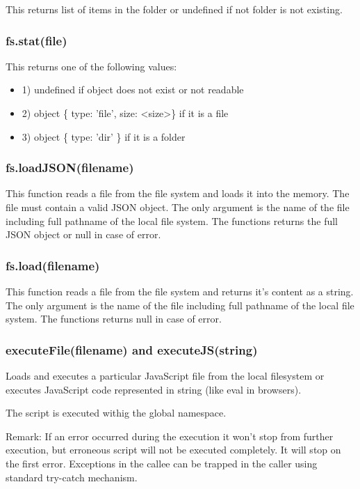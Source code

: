 This returns list of items in the folder or undefined if not folder is not existing.


\subsubsection{fs.stat(file)}

This returns one of the following values:

\begin{itemize}
\item 1) undefined if object does not exist or not readable
\item 2) object \{ type: 'file', size: \textless{}size\textgreater{}\} if it is a file
\item 3) object \{ type: 'dir' \} if it is a folder
\end{itemize} 


\subsubsection{fs.loadJSON(filename)}

This function reads a file from the file system and loads it into the memory. The file must contain a valid JSON object. The only argument is the name of the file including full pathname of the local file system. The functions returns the full JSON object or null in case of error.

\subsubsection{fs.load(filename)}

This function reads a file from the file system and returns it's content as a string. The only argument is the name of the file including full pathname of the local file system. The functions returns null in case of error.

\subsubsection{executeFile(filename) and executeJS(string)}

Loads and executes a particular JavaScript file from the local filesystem or executes JavaScript code represented in string (like eval in browsers).

The script is executed withig the global namespace.

Remark: If an error occurred during the execution it won't stop from further execution, but erroneous script will not be executed completely. It will stop on the first error.
Exceptions in the callee can be trapped in the caller using standard try-catch mechanism.

